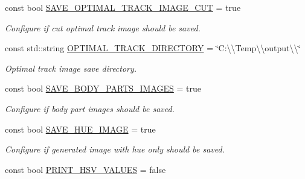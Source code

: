 \begin{DoxyCompactItemize}
const bool \mbox{\hyperlink{namespacedto_1_1_configuration_a7b0c436a8122986f85e489e0900a9f88}{S\+A\+V\+E\+\_\+\+O\+P\+T\+I\+M\+A\+L\+\_\+\+T\+R\+A\+C\+K\+\_\+\+I\+M\+A\+G\+E\+\_\+\+C\+UT}} = true
\begin{DoxyCompactList}\small\item\em Configure if cut optimal track image should be saved. \end{DoxyCompactList}\item 
\mbox{\label{namespacedto_1_1_configuration_ab781b087ba266aeb797ef10852297731}} 
const std\+::string \mbox{\hyperlink{namespacedto_1_1_configuration_ab781b087ba266aeb797ef10852297731}{O\+P\+T\+I\+M\+A\+L\+\_\+\+T\+R\+A\+C\+K\+\_\+\+D\+I\+R\+E\+C\+T\+O\+RY}} = \char`\"{}C\+:\textbackslash{}\textbackslash{}\+Temp\textbackslash{}\textbackslash{}output\textbackslash{}\textbackslash{}\char`\"{}
\begin{DoxyCompactList}\small\item\em Optimal track image save directory. \end{DoxyCompactList}\item 
\mbox{\label{namespacedto_1_1_configuration_abf74d483fc2175b9b7da31d8539ae890}} 
const bool \mbox{\hyperlink{namespacedto_1_1_configuration_abf74d483fc2175b9b7da31d8539ae890}{S\+A\+V\+E\+\_\+\+B\+O\+D\+Y\+\_\+\+P\+A\+R\+T\+S\+\_\+\+I\+M\+A\+G\+ES}} = true
\begin{DoxyCompactList}\small\item\em Configure if body part images should be saved. \end{DoxyCompactList}\item 
\mbox{\label{namespacedto_1_1_configuration_a4d5ea01ef06bdfcc2f23f0865ac83be8}} 
const bool \mbox{\hyperlink{namespacedto_1_1_configuration_a4d5ea01ef06bdfcc2f23f0865ac83be8}{S\+A\+V\+E\+\_\+\+H\+U\+E\+\_\+\+I\+M\+A\+GE}} = true
\begin{DoxyCompactList}\small\item\em Configure if generated image with hue only should be saved. \end{DoxyCompactList}\item 
\mbox{\label{namespacedto_1_1_configuration_a3ec14984e5c5d71be2a90527e131c780}} 
const bool \mbox{\hyperlink{namespacedto_1_1_configuration_a3ec14984e5c5d71be2a90527e131c780}{P\+R\+I\+N\+T\+\_\+\+H\+S\+V\+\_\+\+V\+A\+L\+U\+ES}} = false

\end{DoxyCompactItemize}
